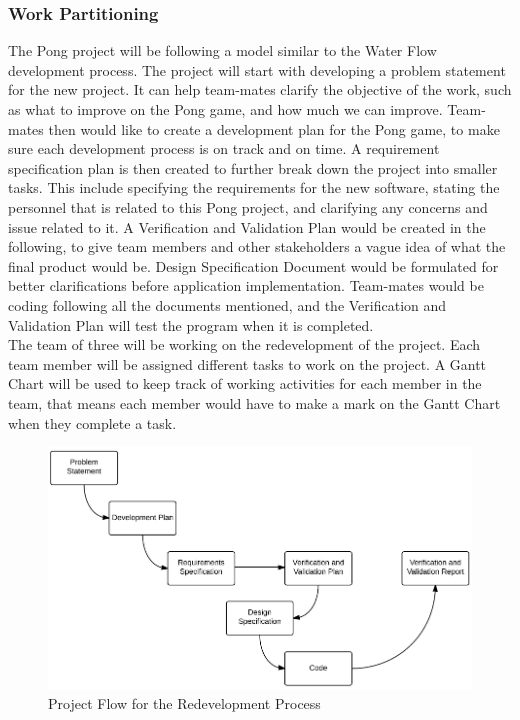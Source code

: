 \documentclass[12pt,letterpaper]{article}
\begin{document}
	\subsubsection{Work Partitioning}
	The Pong project will be following a model similar to the Water Flow development process. The project will start with developing a problem statement for the new project. It can help team-mates clarify the objective of the work, such as what to improve on the Pong game, and how much we can improve. Team-mates then would like to create a development plan for the Pong game, to make sure each development process is on track and on time. A requirement specification plan is then created to further break down the project into smaller tasks. This include specifying the requirements for the new software, stating the personnel that is related to this Pong project, and clarifying any concerns and issue related to it. A Verification and Validation Plan would be created in the following, to give team members and other stakeholders a vague idea of what the final product would be. Design Specification Document would be formulated for better clarifications before application implementation. Team-mates would be coding following all the documents mentioned, and the Verification and Validation Plan will test the program when it is completed.\\

	The team of three will be working on the redevelopment of the project. Each team member will be assigned different tasks to work on the project. A Gantt Chart will be used to keep track of working activities for each member in the team, that means each member would have to make a mark on the Gantt Chart when they complete a task. \\

\begin{figure}[h]
  \includegraphics[scale=0.6]{ProjectFlow.png}
  \caption{Project Flow for the Redevelopment Process}
\end{figure}
\end{document}

